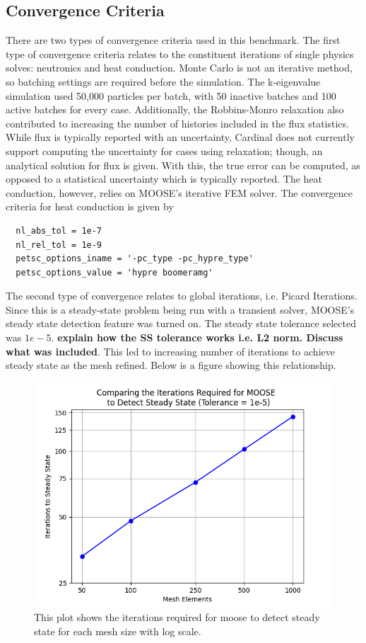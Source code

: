 \documentclass[letterpaper]{mc2023}
\begin{document}
\subsection{Convergence Criteria}
There are two types of convergence criteria used in this benchmark. The first type of convergence criteria relates to the
constituent iterations of single physics solves: neutronics and heat conduction. Monte Carlo is not an iterative method,
so batching settings are required before the simulation. The k-eigenvalue simulation used 50,000 particles per batch,
with 50 inactive batches and 100 active batches for every case. Additionally, the Robbins-Monro relaxation also contributed
to increasing the number of histories included in the flux statistics. While flux is typically reported with an uncertainty,
Cardinal does not currently support computing the uncertainty for cases using relaxation; though, an analytical solution for
flux is given. With this, the true error can be computed, as opposed to a statistical uncertainty which is typically reported.
The heat conduction, however, relies on MOOSE's iterative FEM solver. The convergence criteria for heat conduction is given by

\begin{lstlisting}
  nl_abs_tol = 1e-7
  nl_rel_tol = 1e-9
  petsc_options_iname = '-pc_type -pc_hypre_type'
  petsc_options_value = 'hypre boomeramg'
\end{lstlisting}
The second type of convergence relates to global iterations, i.e. Picard Iterations. Since this is a steady-state problem being
run with a transient solver, MOOSE's steady state detection feature was turned on. The steady state tolerance selected was $1e-5$.
\textbf{explain how the SS tolerance works i.e. L2 norm. Discuss what was included}. This led to increasing number of iterations
to achieve steady state as the mesh refined. Below is a figure showing this relationship.

\begin{figure}[H]
    \centering
    \includegraphics[width=0.7\linewidth]{figures/its_to_ss.png}
    \caption{This plot shows the iterations required for \gls{moose} to detect steady state for each mesh size with log scale.}
    \label{fig:its_to_ss}
\end{figure}
\end{document}
